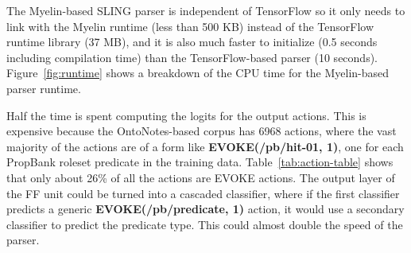 \documentclass[11pt,a4paper]{article}
\begin{document}
The Myelin-based SLING parser is independent of TensorFlow so it only needs to
link with the Myelin runtime (less than 500 KB) instead of the TensorFlow
runtime library (37 MB), and it is also much faster to initialize (0.5 seconds
including compilation time) than the TensorFlow-based parser (10 seconds).
Figure~\ref{fig:runtime} shows a breakdown of the CPU time for the Myelin-based
parser runtime.

Half the time is spent computing the logits for the output
actions. This is expensive because the OntoNotes-based corpus has 6968 actions,
where the vast majority of the actions are of a form like
{\bf EVOKE(/pb/hit-01, 1)}, one for each PropBank roleset predicate in the
training data. Table~\ref{tab:action-table} shows that only about 26\% of all the
actions are EVOKE actions. The output layer of the FF unit could be turned into
a cascaded classifier, where if the first classifier predicts a generic
{\bf EVOKE(/pb/predicate, 1)} action, it would use a secondary classifier to
predict the predicate type. This could almost double the speed of the parser.



\end{document}
